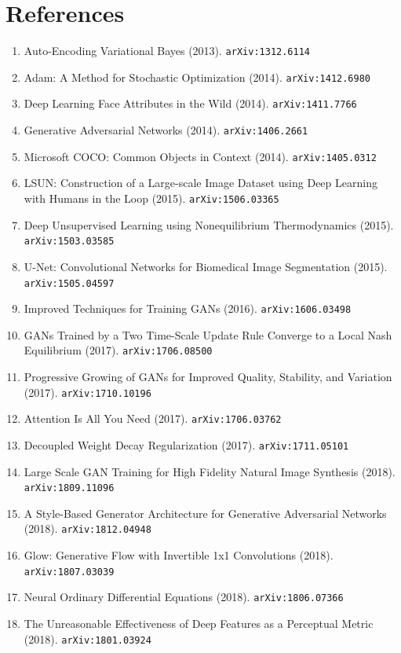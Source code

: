 \documentclass[11pt]{article}
\begin{document}
\section*{References}
\begin{enumerate}\small
  \item Auto-Encoding Variational Bayes (2013). \texttt{arXiv:1312.6114}
  \item Adam: A Method for Stochastic Optimization (2014). \texttt{arXiv:1412.6980}
  \item Deep Learning Face Attributes in the Wild (2014). \texttt{arXiv:1411.7766}
  \item Generative Adversarial Networks (2014). \texttt{arXiv:1406.2661}
  \item Microsoft COCO: Common Objects in Context (2014). \texttt{arXiv:1405.0312}
  \item LSUN: Construction of a Large-scale Image Dataset using Deep Learning
  with Humans in the Loop (2015). \texttt{arXiv:1506.03365}
  \item Deep Unsupervised Learning using Nonequilibrium Thermodynamics (2015). \texttt{arXiv:1503.03585}
  \item U-Net: Convolutional Networks for Biomedical Image Segmentation (2015). \texttt{arXiv:1505.04597}
  \item Improved Techniques for Training GANs (2016). \texttt{arXiv:1606.03498}
  \item GANs Trained by a Two Time-Scale Update Rule Converge to a Local Nash
  Equilibrium (2017). \texttt{arXiv:1706.08500}
  \item Progressive Growing of GANs for Improved Quality, Stability, and
  Variation (2017). \texttt{arXiv:1710.10196}
  \item Attention Is All You Need (2017). \texttt{arXiv:1706.03762}
  \item Decoupled Weight Decay Regularization (2017). \texttt{arXiv:1711.05101}
  \item Large Scale GAN Training for High Fidelity Natural Image Synthesis (2018). \texttt{arXiv:1809.11096}
  \item A Style-Based Generator Architecture for Generative Adversarial Networks (2018). \texttt{arXiv:1812.04948}
  \item Glow: Generative Flow with Invertible 1x1 Convolutions (2018). \texttt{arXiv:1807.03039}
  \item Neural Ordinary Differential Equations (2018). \texttt{arXiv:1806.07366}
  \item The Unreasonable Effectiveness of Deep Features as a Perceptual Metric (2018). \texttt{arXiv:1801.03924}

\end{enumerate}
\end{document}
